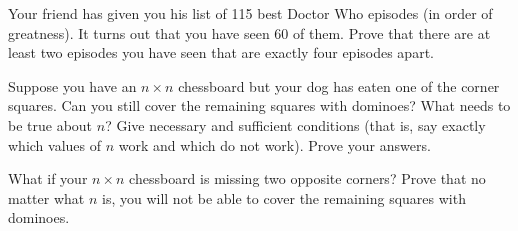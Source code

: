 \documentclass[10pt,]{book}
\theoremstyle{plain}
\theoremstyle{definition}
\theoremstyle{definition}
\theoremstyle{definition}
\theoremstyle{definition}
\numberwithin{equation}{chapter}
\begin{document}
\begin{divisionexercise}{18}\hypertarget{exercise-253}{}
\hypertarget{p-2084}{}%
Your friend has given you his list of 115 best Doctor Who episodes (in order of greatness).  It turns out that you have seen 60 of them.  Prove that there are at least two episodes you have seen that are exactly four episodes apart.%
\end{divisionexercise}%
\begin{divisionexercise}{19}\hypertarget{exercise-254}{}
\hypertarget{p-2085}{}%
Suppose you have an \(n\times n\) chessboard but your dog has eaten one of the corner squares. Can you still cover the remaining squares with dominoes? What needs to be true about \(n\)? Give necessary and sufficient conditions (that is, say exactly which values of \(n\) work and which do not work). Prove your answers.%
\begin{sidebyside}{1}{0.4}{0.4}{0}
\begin{sbspanel}{0.2}
\end{sbspanel}
\end{sidebyside}
\end{divisionexercise}%
\begin{divisionexercise}{20}\hypertarget{exercise-255}{}
\hypertarget{p-2086}{}%
What if your \(n\times n\) chessboard is missing two opposite corners? Prove that no matter what \(n\) is, you will not be able to cover the remaining squares with dominoes.%
\begin{sidebyside}{1}{0.4}{0.4}{0}
\begin{sbspanel}{0.2}
\end{sbspanel}
\end{sidebyside}
\end{divisionexercise}%
\typeout{************************************************}
\typeout{************************************************}
\end{document}

